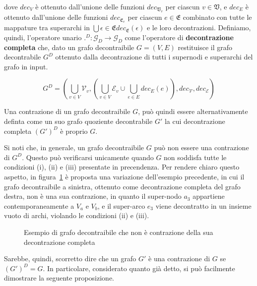     dove $dec_V$ è ottenuto dall'unione delle funzioni $dec_{\mathfrak{V}_v}$ per ciascun $v \in \mathfrak{V}$,
    e $dec_E$ è ottenuto dall'unione delle funzioni $dec_{\mathfrak{E}_e}$ per ciascun $e \in \mathfrak{E}$ combinato con
    tutte le mappature tra superarchi in $\bigcup{\epsilon \in \mathfrak{E}} dec_{\mathfrak{E}}(\epsilon)$ e le loro
    decontrazioni.
    Definiamo, quindi, l'operatore unario $.^D : \mathcal{G}_D \rightarrow \mathcal{G}_D$ come l'operatore di
    \textbf{decontrazione completa} che, dato un grafo decontraibile $G = (V, E)$ restituisce il grafo decontrabile
    $G^D$ ottenuto dalla decontrazione di tutti i supernodi e superarchi del grafo in input.

    \begin{equation*}
        G^D = (\bigcup_{v \in V} \mathcal{V}_v , (\bigcup_{v \in V} \mathcal{E}_v \cup \bigcup_{e \in E} dec_E(e)),
        dec_{\mathcal{V}}, dec_{\mathcal{E}})
    \end{equation*}

    Una contrazione di un grafo decontraibile $G$, pu\`o quindi essere alternativamente definta come un suo grafo
    quoziente decontrabile $G'$ la cui decontrazione completa $(G')^D$ \`e proprio $G$.
    \newline

    Si noti che, in generale, un grafo decontraibile $G$ pu\`o non essere una contrazione di $G^D$.
    Questo pu\`o verificarsi unicamente quando $G$ non soddisfa tutte le condizioni (i), (ii) e (iii) presentate in
    precendenza. \newline
    Per rendere chiaro questo aspetto, in figura~\ref{fig:non-contraction-example} \`e proposta una variazione
    dell'esempio precedente, in cui il grafo decontraibile a sinistra, ottenuto come decontrazione completa del grafo
    destra, non \`e una sua contrazione, in quanto il super-nodo $a_3$ appartiene contemporaneamente a $V_a$ e $V_b$,
    e il super-arco $e_3$ viene decontratto in un insieme vuoto di archi, violando le condizioni (ii) e (iii).

    \begin{figure}
        \centering
        
        \caption{Esempio di grafo decontraibile che non \`e contrazione della sua decontrazione completa}
        \label{fig:non-contraction-example}
    \end{figure}

    Sarebbe, quindi, scorretto dire che un grafo $G'$ \`e una contrazione di $G$ se $(G')^D = G$.
    In particolare, considerato quanto gi\`a detto, si pu\`o facilmente dimostrare la seguente proposizione.


